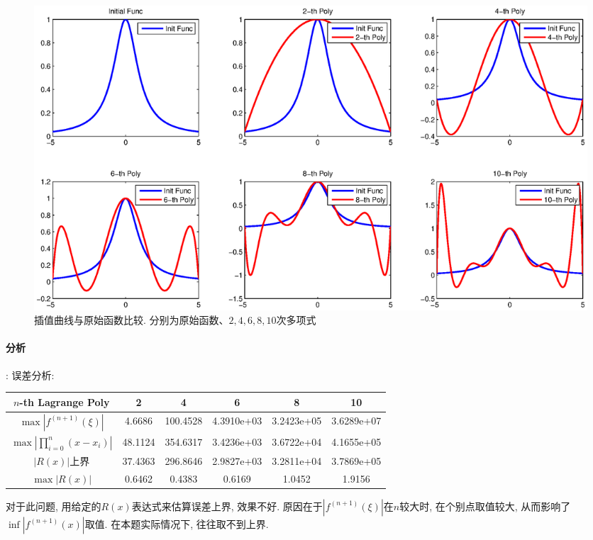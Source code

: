 \documentclass{article}
\begin{document}
\begin{CJK*}{UTF8}{song}
	 			\begin{figure}[H]
	 				\centering
	 				\includegraphics[width=1.0\textwidth]{../chapter3_1_tot.eps}
	 				\caption{插值曲线与原始函数比较. 分别为原始函数、$2,4,6,8,10$次多项式}
	 				\label{img_chapter3_1_tot}
	 			\end{figure}
 			\paragraph{分析}:\newline
 				误差分析:\\
 				\begin{tabular}{|c|c|c|c|c|c|}
 					\hline
 					 $n$-th Lagrange Poly & 2 & 4 & 6 & 8 & 10\\
 					\hline
 					$\max \left| f^{\left(n+1\right)}\left(\xi\right) \right| $ & 4.6686 &100.4528 & 4.3910e+03& 3.2423e+05 &  3.6289e+07\\
					\hline
					$\max\left|\prod_{i=0}^{n}\left(x-x_i\right) \right| $ & 48.1124
					 & 354.6317 & 3.4236e+03 & 3.6722e+04 & 4.1655e+05 \\
 					\hline 
 					$\left| R\left(x\right)\right|$上界 &37.4363 &296.8646 &2.9827e+03& 3.2811e+04 &3.7869e+05 \\
 					\hline
 					$\max \left|R\left(x\right) \right|$& 0.6462 & 0.4383 & 0.6169 & 1.0452 & 1.9156 \\
 					\hline
 				\end{tabular}
 			
 				对于此问题, 用给定的$R\left(x\right)$表达式来估算误差上界, 效果不好. 原因在于$\left|f^{\left(n+1\right)}\left(\xi\right) \right|$在$n$较大时, 在个别点取值较大, 从而影响了$\inf \left|f^{\left(n+1\right)} \left(x\right) \right|$取值. 在本题实际情况下, 往往取不到上界.
 				

\end{CJK*}
\end{document}
